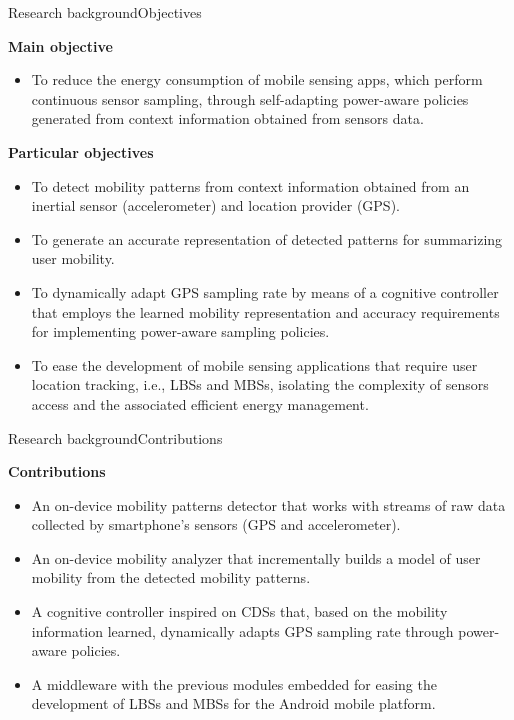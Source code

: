 \begin{frame}{Research background}{Objectives}
\small
\begin{block}{\small \textbf{Main objective}}
\begin{itemize}
  \item To reduce the energy consumption of mobile sensing apps, which perform continuous sensor sampling, through self-adapting power-aware policies generated from context information obtained from sensors data.
\end{itemize}
\end{block}

\begin{block}{\small \textbf{Particular objectives}}
\begin{itemize}
  \item To detect mobility patterns from context information obtained from an inertial sensor (accelerometer) and location provider (GPS).
  \item To generate an accurate representation of detected patterns for summarizing user mobility.
  \item To dynamically adapt GPS sampling rate by means of a cognitive controller that employs the learned mobility representation and accuracy requirements for implementing power-aware sampling policies.
  \item To ease the development of mobile sensing applications that require user location tracking, i.e., LBSs and MBSs, isolating the complexity of sensors access and the associated efficient energy management.
\end{itemize}
\end{block}
\end{frame}

\begin{frame}{Research background}{Contributions}
\small
\begin{block}{\small \textbf{Contributions}}
\begin{itemize}
  \item An on-device mobility patterns detector that works with streams of raw data collected by smartphone's sensors (GPS and accelerometer).
  \item An on-device mobility analyzer that incrementally builds a model of user mobility from the detected mobility patterns.
  \item A cognitive controller inspired on CDSs that, based on the mobility information learned, dynamically adapts GPS sampling rate through power-aware policies. 
  \item A middleware with the previous modules embedded for easing the development of LBSs and MBSs for the Android mobile platform.
\end{itemize}
\end{block}
\end{frame}

